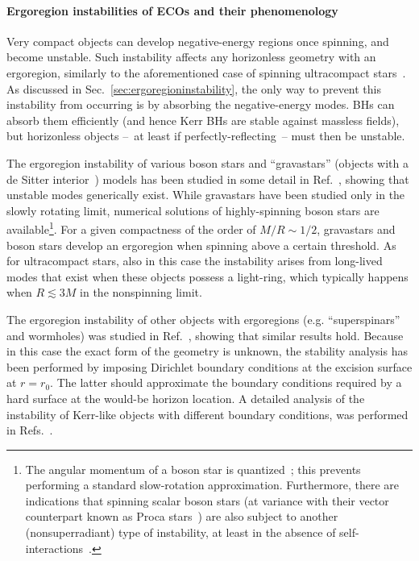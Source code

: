 \documentclass[11pt]{article}
\numberwithin{equation}{section} %
\begin{document}
\paragraph{Ergoregion instabilities of ECOs and their phenomenology}
%
Very compact objects can develop negative-energy regions once spinning, and become unstable. Such instability affects 
any horizonless geometry with an ergoregion, similarly to the aforementioned case of spinning ultracompact 
stars~\cite{Friedman:1978wla,Kokkotas:2002sf,Moschidis:2016zjy,Cardoso:2007az,Oliveira:2014oja,Maggio:2017ivp,
Vicente:2018mxl}. As discussed in Sec.~\ref{sec:ergoregioninstability}, the only way to prevent this 
instability from occurring is by absorbing the negative-energy modes. BHs can absorb them efficiently (and hence Kerr 
BHs are stable against massless fields), but horizonless objects --~at least if perfectly-reflecting~-- must then be 
unstable.

The ergoregion instability of various boson stars and ``gravastars'' (objects with a de Sitter interior~\cite{Mazur:2001fv}) 
models has been studied in some detail in Ref.~\cite{Cardoso:2007az,Chirenti:2008pf}, showing that unstable modes generically exist. 
While gravastars have been studied only in the slowly rotating limit, numerical solutions of highly-spinning boson stars are available\footnote{The 
angular momentum of a boson star is quantized~\cite{Liebling:2012fv}; this prevents performing a standard slow-rotation 
approximation. Furthermore, there are indications that spinning scalar boson stars (at variance with their vector counterpart known as Proca 
stars~\cite{Brito:2015pxa}) are also subject to another (nonsuperradiant) type of instability, at least in the absence 
of self-interactions~\cite{Sanchis-Gual:2019ljs}.}. For a given compactness of the order of $M/R\sim 1/2$, gravastars 
and boson stars develop an ergoregion when spinning above a certain threshold. As for ultracompact stars, also in this 
case the instability arises from long-lived modes that exist when these objects possess a light-ring, which typically 
happens when $R\lesssim 3M$ in the nonspinning limit.

The ergoregion instability of other objects with ergoregions (e.g. ``superspinars'' and wormholes) was studied in Ref.~\cite{Cardoso:2008kj}, showing 
that similar results hold. Because in this case the exact form of the geometry is unknown, the stability analysis has 
been performed by imposing Dirichlet boundary conditions at the excision surface at $r=r_0$. The latter should 
approximate the boundary conditions required by a hard surface at the would-be horizon location. A detailed analysis of 
the instability of Kerr-like objects with different boundary conditions, was performed in 
Refs.~\cite{Pani:2010jz,Maggio:2017ivp,Maggio:2018ivz}.
\end{document}
